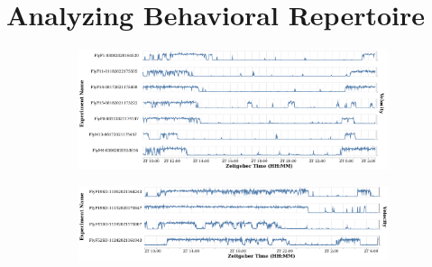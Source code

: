 \section{Analyzing Behavioral Repertoire}\label{section:analyzing-behavioral-repertoire}

\begin{figure}[ht!]
	\centering
	\begin{subfigure}[ht!]{0.9\linewidth}
		\centering\includegraphics[width=\linewidth]{figures/Velocity-WT-1T.pdf}
		\caption{}
	\end{subfigure}%

	\begin{subfigure}[ht!]{0.9\linewidth}
		\centering\includegraphics[width=\linewidth]{figures/Velocity-SD-1T.pdf}
		\caption{}
	\end{subfigure}%
\end{figure}

